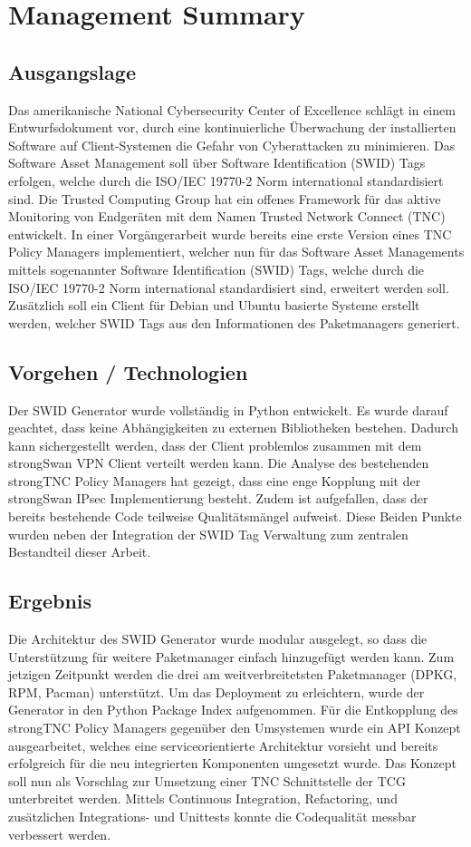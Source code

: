 \chapter{Management Summary}

\section{Ausgangslage}
Das amerikanische National Cybersecurity Center of Excellence schlägt in einem
Entwurfsdokument  vor, durch eine kontinuierliche Überwachung der installierten
Software auf Client-Systemen die Gefahr von Cyberattacken zu minimieren. Das
Software  Asset Management soll über Software Identification (SWID) Tags
erfolgen, welche durch die ISO/IEC 19770-2 Norm international
standardisiert sind. Die Trusted Computing Group hat ein offenes Framework für
das aktive Monitoring von Endgeräten  mit dem Namen Trusted Network Connect
(TNC) entwickelt. In einer Vorgängerarbeit wurde bereits eine erste Version
eines TNC Policy Managers implementiert, welcher nun für das Software Asset
Managements mittels sogenannter Software Identification (SWID) Tags, welche
durch die ISO/IEC 19770-2 Norm international standardisiert sind,
erweitert werden soll. Zusätzlich soll ein Client für Debian und Ubuntu basierte
Systeme erstellt werden, welcher SWID Tags aus den Informationen des
Paketmanagers generiert.

\section{Vorgehen / Technologien}
Der SWID Generator wurde vollständig in Python entwickelt. Es wurde darauf
geachtet, dass keine Abhängigkeiten zu externen Bibliotheken bestehen. Dadurch
kann sichergestellt werden, dass der Client problemlos zusammen mit dem
strongSwan VPN Client verteilt werden kann. Die Analyse des bestehenden
strongTNC Policy Managers hat gezeigt, dass eine enge Kopplung mit der
strongSwan IPsec Implementierung besteht. Zudem ist aufgefallen, dass der
bereits bestehende Code teilweise Qualitätsmängel aufweist. Diese Beiden Punkte
wurden neben der Integration der SWID Tag Verwaltung zum zentralen Bestandteil
dieser Arbeit.

\section{Ergebnis}
Die Architektur des SWID Generator wurde modular ausgelegt, so dass die
Unterstützung für weitere Paketmanager einfach hinzugefügt werden kann. Zum
jetzigen Zeitpunkt werden die drei am weitverbreitetsten Paketmanager (DPKG,
RPM, Pacman) unterstützt. Um das Deployment zu erleichtern, wurde  der Generator
in den Python Package Index aufgenommen. Für die Entkopplung des strongTNC
Policy Managers gegenüber den Umsystemen wurde ein API Konzept ausgearbeitet,
welches eine serviceorientierte Architektur vorsieht und bereits erfolgreich für
die neu integrierten Komponenten umgesetzt wurde. Das Konzept soll nun als
Vorschlag zur Umsetzung einer TNC Schnittstelle der TCG unterbreitet werden.
Mittels Continuous Integration, Refactoring, und zusätzlichen Integrations- und
Unittests konnte die Codequalität messbar verbessert werden.
